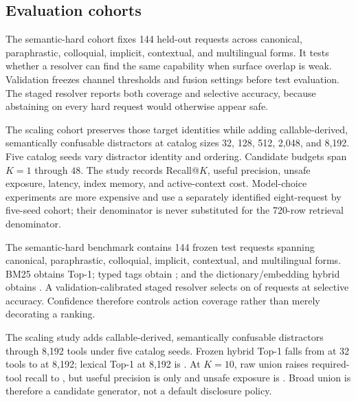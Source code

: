 \documentclass[11pt]{article}
\begin{document}
\subsection{Evaluation cohorts}

The semantic-hard cohort fixes 144 held-out requests across canonical,
paraphrastic, colloquial, implicit, contextual, and multilingual forms. It
tests whether a resolver can find the same capability when surface overlap is
weak. Validation freezes channel thresholds and fusion settings before test
evaluation. The staged resolver reports both coverage and selective accuracy,
because abstaining on every hard request would otherwise appear safe.

The scaling cohort preserves those target identities while adding
callable-derived, semantically confusable distractors at catalog sizes 32, 128,
512, 2,048, and 8,192. Five catalog seeds vary distractor identity and ordering.
Candidate budgets span $K=1$ through $48$. The study records Recall@$K$, useful
precision, unsafe exposure, latency, index memory, and active-context cost.
Model-choice experiments are more expensive and use a separately identified
eight-request by five-seed cohort; their denominator is never substituted for
the 720-row retrieval denominator.

The semantic-hard benchmark contains 144 frozen test requests spanning
canonical, paraphrastic, colloquial, implicit, contextual, and multilingual
forms. BM25 obtains \PaperSixFiveSemanticBMTopOne{} Top-1; typed tags obtain
\PaperSixFiveSemanticTagsTopOne{}; and the dictionary/embedding hybrid obtains
\PaperSixFiveSemanticHybridTopOne{}. A validation-calibrated staged resolver
selects on \PaperSixFiveSemanticCoverage{} of requests at
\PaperSixFiveSemanticSelectiveAccuracy{} selective accuracy. Confidence
therefore controls action coverage rather than merely decorating a ranking.

The scaling study adds callable-derived, semantically confusable distractors
through 8,192 tools under five catalog seeds. Frozen hybrid Top-1 falls from
\PaperSixFiveScaleThirtyTwoHybridTopOne{} at 32 tools to
\PaperSixFiveScaleEightKHybridTopOne{} at 8,192; lexical Top-1 at 8,192 is
\PaperSixFiveScaleEightKLexicalTopOne{}. At $K=10$, raw union raises required-
tool recall to \PaperSixFiveScaleEightKUnionRecallTen{}, but useful precision is
only \PaperSixFiveScaleEightKUnionPrecisionTen{} and unsafe exposure is
\PaperSixFiveScaleEightKUnionUnsafeTen{}. Broad union is therefore a candidate
generator, not a default disclosure policy.
\end{document}
